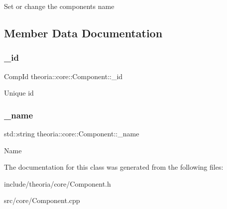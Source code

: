 Set or change the components name 

\subsection{Member Data Documentation}
\mbox{\label{classtheoria_1_1core_1_1Component_a460b08de1c87f984fe9b6e4a1b8b50e6}} 
\subsubsection{\texorpdfstring{\+\_\+id}{\_id}}
{\footnotesize\ttfamily Comp\+Id theoria\+::core\+::\+Component\+::\+\_\+id\hspace{0.3cm}{\ttfamily [protected]}}

Unique id \mbox{\label{classtheoria_1_1core_1_1Component_ac1eca19b044721b873a0ec32cf3667a1}} 
\subsubsection{\texorpdfstring{\+\_\+name}{\_name}}
{\footnotesize\ttfamily std\+::string theoria\+::core\+::\+Component\+::\+\_\+name\hspace{0.3cm}{\ttfamily [protected]}}

Name 

The documentation for this class was generated from the following files\+:\begin{DoxyCompactItemize}
\item 
include/theoria/core/Component.\+h\item 
src/core/Component.\+cpp\end{DoxyCompactItemize}
